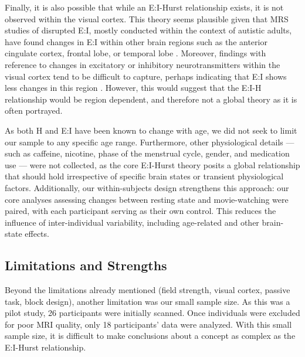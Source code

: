 \documentclass[
true
]{sn-jnl}
\begin{document}
Finally, it is also possible that while an E:I-Hurst relationship
exists, it is not observed within the visual cortex. This theory seems
plausible given that MRS studies of disrupted E:I, mostly conducted
within the context of autistic adults, have found changes in E:I within
other brain regions such as the anterior cingulate cortex, frontal lobe,
or temporal lobe \citep{ajramContribution1HMagnetic2019}. Moreover,
findings with reference to changes in excitatory or inhibitory
neurotransmitters within the visual cortex tend to be difficult to
capture, perhaps indicating that E:I shows less changes in this region
\citep{pasantaFunctionalMRSStudies2023}. However, this would suggest
that the E:I-H relationship would be region dependent, and therefore not
a global theory as it is often portrayed.

As both H and E:I have been known to change with age, we did not seek to
limit our sample to any specific age range. Furthermore, other
physiological details --- such as caffeine, nicotine, phase of the
menstrual cycle, gender, and medication use --- were not collected, as
the core E:I-Hurst theory posits a global relationship that should hold
irrespective of specific brain states or transient physiological
factors. Additionally, our within-subjects design strengthens this
approach: our core analyses assessing changes between resting state and
movie-watching were paired, with each participant serving as their own
control. This reduces the influence of inter-individual variability,
including age-related and other brain-state effects.

\subsection{Limitations and Strengths}\label{limitations-and-strengths}

Beyond the limitations already mentioned (field strength, visual cortex,
passive task, block design), another limitation was our small sample
size. As this was a pilot study, 26 participants were initially scanned.
Once individuals were excluded for poor MRI quality, only 18
participants' data were analyzed. With this small sample size, it is
difficult to make conclusions about a concept as complex as the
E:I-Hurst relationship.
\end{document}
